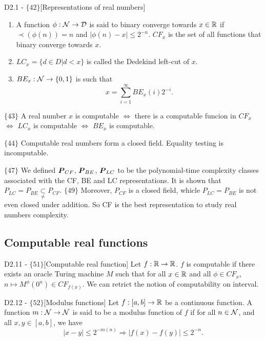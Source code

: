 \documentclass{article}
\begin{document}
\begin{flexidefinition}{D2.1 - $\{42\}$}[Representations of real numbers]
    \begin{enumerate}[label = (\alph*)]
        \item A function $\phi : \mathcal{N} \to \mathcal{D}$ is said to binary converge towards $x \in \mathbb{R}$ if $\prec(\phi(n)) = n$ and $|\phi(n) - x| \leq 2^{-n}$. $CF_x$ is the set of all functions that binary converge towards $x$.
        \item $LC_x = \{d \in D | d < x\}$ is called the Dedekind left-cut of $x$.
        \item $BE_x : \mathcal{N} \to \{0,1\}$ is such that 
        \begin{equation}
           x =\sum_{i=1}^\infty BE_x(i) 2^{-i}.
        \end{equation}
    \end{enumerate}
\end{flexidefinition}
$\{43\}$ A real number $x$ is computable $\iff$ there is a computable funcion in $CF_x$ $\iff$ $LC_x$ is computable $\iff$ $BE_x$ is computable.

$\{44\}$ Computable real numbers form a closed field. Equality testing is incomputable.

$\{47\}$ We defined $\boldsymbol{P}_{CF}$, $\boldsymbol{P}_{BE}$, $\boldsymbol{P}_{LC}$ to be the polynomial-time complexity classes associated with the CF, BE and LC representations. It is shown that $P_{LC} = P_{BE} \underset{\neq}{\subset} P_{CF}$. $\{49\}$ Moreover, $P_{CF}$ is a closed field, whicle $P_{LC} = P_{BE}$ is not even closed under addition. So CF is the best representation to study real numbers complexity.

\subsection{Computable real functions}

\begin{flexidefinition}{D2.11 - $\{51\}$}[Computable real function]
    Let $f : \mathbb{R} \to \mathbb{R}$. $f$ is computable if there exists an oracle Turing machine $M$ such that for all $x \in \mathbb{R}$ and all $\phi \in CF_x$, $n \mapsto M^\phi(0^n) \in CF_{f(x)}$. We can retrict the notion of computability on interval.
\end{flexidefinition}

\begin{flexidefinition}{D2.12 - $\{52\}$}[Modulus functions]
    Let $f : [a,b] \to \mathbb{R}$ be a continuous function. A function $m : \mathcal{N} \to \mathcal{N}$ is said to be a modulus function of $f$ if for all $n \in \mathcal{N}$, and all $x,y \in [a,b]$, we have
    \begin{equation}
        |x - y| \leq 2^{-m(n)} \Rightarrow |f(x) - f(y)| \leq 2^{-n}.
    \end{equation}
\end{flexidefinition}
\end{document}
